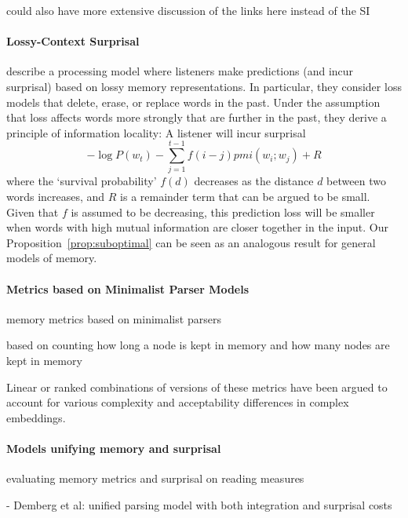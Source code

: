 could also have more extensive discussion of the links here instead of the SI


\paragraph{Lossy-Context Surprisal}
\citet{futrell-noisy-context-2017} describe a processing model where listeners make predictions (and incur surprisal) based on lossy memory representations.
In particular, they consider loss models that delete, erase, or replace words in the past.
Under the assumption that loss affects words more strongly that are further in the past, they derive a principle of information locality:
A listener will incur surprisal
$$ -\log P(w_t) - \sum_{j=1}^{t-1} f(i-j) pmi(w_i; w_j) + R$$
where the `survival probability' $f(d)$ decreases as the distance $d$ between two words increases, and $R$ is a remainder term that can be argued to be small.
Given that $f$ is assumed to be decreasing, this prediction loss will be smaller when words with high mutual information are closer together in the input.
Our Proposition~\ref{prop:suboptimal} can be seen as an analogous result for general models of memory.


\paragraph{Metrics based on Minimalist Parser Models}
memory metrics based on minimalist parsers

\cite{kobele2013memory}
\cite{graf2014evaluating}
\cite{GrafEtAl15MOL}
\cite{gerth2015memory}
\cite{GrafEtAl17JLM}
\cite{desanto2020parsing}
based on counting how long a node is kept in memory and how many nodes are kept in memory

Linear or ranked combinations of versions of these metrics have been argued to account for various complexity and acceptability differences in complex embeddings.

\paragraph{Models unifying memory and surprisal}


evaluating memory metrics and surprisal on reading measures \cite{boston2008parsing} \cite{demberg2008data} \cite{boston2011parallel}

- Demberg et al: unified parsing model with both integration and surprisal costs \cite{demberg2009computational,demberg2013incremental}

